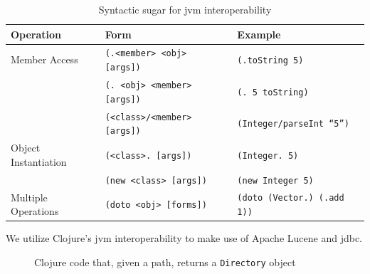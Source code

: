 			\begin{table}
				\centering
				
				\begin{tabular}{lll}
					\toprule
					Operation & Form & Example \\
					\midrule
					Member Access & \texttt{(.<member> <obj> [args])} & \texttt{(.toString 5)} \\
					 & \texttt{(. <obj> <member> [args])} & \texttt{(. 5 toString)} \\
					 & \texttt{(<class>/<member> [args])} & \texttt{(Integer/parseInt ``5'')} \\
					Object Instantiation & \texttt{(<class>. [args])} & \texttt{(Integer. 5)} \\
					 & \texttt{(new <class> [args])} & \texttt{(new Integer 5)} \\
					Multiple Operations & \texttt{(doto <obj> [forms])} & \texttt{(doto (Vector.) (.add 1))} \\
					\bottomrule
				\end{tabular}
				
				\caption{Syntactic sugar for \gls{jvm} interoperability}
				\label{tbl:jvm-interop-syntax}
			\end{table}
			
			We utilize Clojure's \gls{jvm} interoperability to make use of Apache Lucene and \gls{jdbc}.
			
			\begin{figure}
				\begin{singlespaced}
				\end{singlespaced}
				
				\caption{Clojure code that, given a path, returns a \texttt{Directory} object}
			\end{figure}